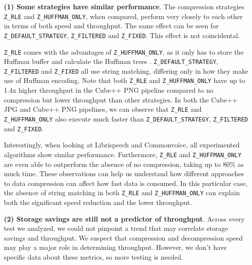 \documentclass[sigconf,nonacm]{acmart}
\begin{document}
\textbf{(1) Some strategies have similar performance}.
The compression strategies \texttt{Z\_RLE} and \texttt{Z\_HUFFMAN\_ONLY}, when compared, perform very closely to each other in terms of both speed and throughput.
The same effect can be seen for \texttt{Z\_DEFAULT\_STRATEGY}, \texttt{Z\_FILTERED} and \texttt{Z\_FIXED}.
This effect is not coincidental.

\texttt{Z\_RLE} comes with the advantages of \texttt{Z\_HUFFMAN\_ONLY}, as it only has to store the Huffman buffer and calculate the Huffman trees \cite{zlib2000zrle}.
\texttt{Z\_DEFAULT\_STRATEGY}, \texttt{Z\_FILTERED} and \texttt{Z\_FIXED} all use string matching, differing only in how they make use of Huffman encoding.
Note that both \texttt{Z\_RLE} and \texttt{Z\_HUFFMAN\_ONLY} have up to 1.4x higher throughput in the Cube++ PNG pipeline compared to no compression but lower throughput than other strategies.
In both the Cube++ JPG and Cube++ PNG pipelines, we can observe that \texttt{Z\_RLE} and \texttt{Z\_HUFFMAN\_ONLY} also execute much faster than \texttt{Z\_DEFAULT\_STRATEGY}, \texttt{Z\_FILTERED} and \texttt{Z\_FIXED}.

Interestingly, when looking at Librispeech and Commonvoice, all experimented algorithms show similar performance.
Furthermore, \texttt{Z\_RLE} and \texttt{Z\_HUFFMAN\_ONLY} are even able to outperform the absence of no compression, taking up to 80\% as much time.
These observations can help us understand how different approaches to data compression can affect how fast data is consumed.
In this particular case, the absence of string matching in both \texttt{Z\_RLE} and \texttt{Z\_HUFFMAN\_ONLY} can explain both the significant speed reduction and the lower throughput.

\textbf{(2) Storage savings are still not a predictor of throughput}.
Across every test we analyzed, we could not pinpoint a trend that may correlate storage savings and throughput.
We suspect that compression and decompression speed may play a major role in determining throughput.
However, we don't have specific data about these metrics, so more testing is needed.
\end{document}
